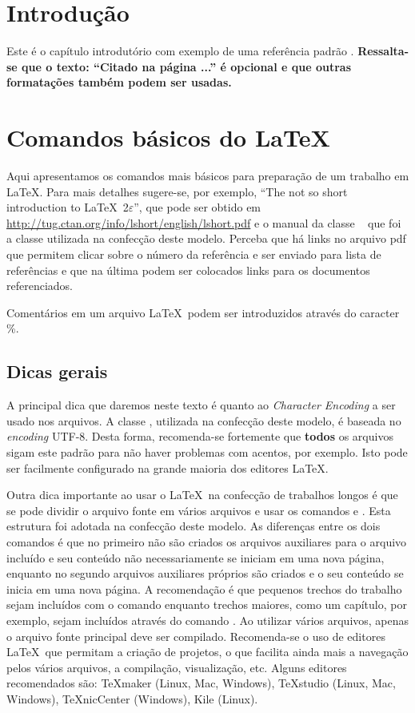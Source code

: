 \chapter{Introdução}

Este é o capítulo introdutório com exemplo de uma referência padrão \cite{exemplo}. \textbf{Ressalta-se que o texto: ``Citado na página ...'' é opcional e que outras formatações também podem ser usadas.}
 

\chapter{Comandos básicos do \LaTeX \label{cap1}}


Aqui apresentamos os comandos mais básicos para preparação de um trabalho em \LaTeX. Para mais detalhes sugere-se, por exemplo, ``The not so short introduction to  \LaTeX\  2$\varepsilon$''\cite{lshort}, que pode ser obtido em \url{http://tug.ctan.org/info/lshort/english/lshort.pdf} e o manual da classe \abnTeX\ \cite{abntex2classe} que foi a classe utilizada na confecção deste modelo. Perceba que há links no arquivo pdf que permitem clicar sobre o número da referência e ser enviado para lista de referências e que na última podem ser colocados links para os documentos referenciados.

Comentários em um arquivo \LaTeX\  podem ser introduzidos através do caracter \%. 

\section{Dicas gerais}

A principal dica que daremos neste texto é quanto ao \emph{Character Encoding} a ser usado nos arquivos. A classe \abnTeX, utilizada na confecção deste modelo, é baseada no \emph{encoding} UTF-8. Desta forma, recomenda-se fortemente que \textbf{todos} os arquivos sigam este padrão para não haver problemas com acentos, por exemplo. Isto pode ser facilmente configurado na grande maioria dos editores \LaTeX.

Outra dica importante ao usar o  \LaTeX\ na confecção de trabalhos longos é que se pode dividir o arquivo fonte em vários arquivos e usar os comandos \verb++ e \verb++. Esta estrutura foi adotada na confecção deste modelo. As diferenças entre os dois comandos é que no primeiro não são criados os arquivos auxiliares para o arquivo incluído e seu conteúdo não necessariamente se iniciam em uma nova página, enquanto no segundo arquivos auxiliares próprios são criados e o seu conteúdo se inicia em uma nova página. A recomendação é que pequenos trechos do trabalho sejam incluídos com o comando \verb++ enquanto trechos maiores, como um capítulo, por exemplo, sejam incluídos através do comando \verb++. Ao utilizar vários arquivos, apenas o arquivo fonte principal deve ser compilado. Recomenda-se o uso de editores   \LaTeX\ que permitam a criação de projetos, o que facilita ainda mais a navegação pelos vários arquivos, a compilação, visualização, etc. Alguns editores recomendados são:
TeXmaker (Linux, Mac, Windows), TeXstudio (Linux, Mac, Windows), TeXnicCenter (Windows), Kile (Linux). 

